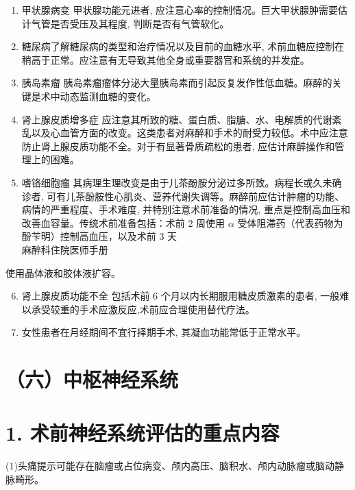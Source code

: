 \documentclass[10pt]{article}
\begin{document}
\begin{enumerate}
  \item 甲状腺病变 甲状腺功能元进者, 应注意心率的控制情况。巨大甲状腺肿需要估计气管是否受压及其程度, 判断是否有气管软化。

  \item 糖尿病了解糖尿病的类型和治疗情况以及目前的血糖水平, 术前血糖应控制在稍高于正常。应注意有无导致其他全身或重要器官和系统的并发症。

  \item 胰岛素瘤 胰岛素瘤瘤体分泌大量胰岛素而引起反复发作性低血糖。麻醉的关键是术中动态监测血糖的变化。

  \item 肾上腺皮质增多症 应注意其所致的糖、蛋白质、脂膅、水、电解质的代谢紊乱以及心血管方面的改变。这类患者对麻醉和手术的耐受力较低。术中应注意防止肾上腺皮质功能不全。对于有显著骨质疏松的患者, 应估计麻醉操作和管理上的困难。

  \item 嗜铬细胞瘤 其病理生理改变是由于儿茶酚胺分泌过多所致。病程长或久未确诊者, 可有儿茶酚胺性心肌炎、营养代谢失调等。麻醉前应估计肿瘤的功能、病情的严重程度、手术难度, 并特别注意术前准备的情况, 重点是控制高血压和改善血容量。传统术前准备包括：术前 2 周使用 $\alpha$ 受体阻滞药（代表药物为酚苄明）控制高血压，以及术前 3 天\\
麻醉科住院医师手册

\end{enumerate}

使用晶体液和胶体液扩容。

\begin{enumerate}
  \setcounter{enumi}{5}
  \item 肾上腺皮质功能不全 包括术前 6 个月以内长期服用糖皮质激素的患者, 一般难以承受较重的手术应激反应,术前应合理使用替代疗法。

  \item 女性患者在月经期间不宜行择期手术, 其凝血功能常低于正常水平。

\end{enumerate}

\section*{（六）中枢神经系统}
\section*{1. 术前神经系统评估的重点内容}
(1)头痛提示可能存在脑瘤或占位病变、颅内高压、脑积水、颅内动脉瘤或脑动静脉畸形。
\end{document}
